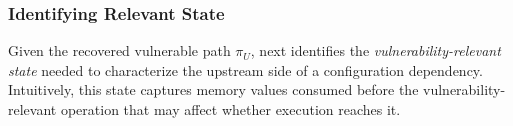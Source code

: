 




\subsubsection{Identifying Relevant State}\label{subsubsec:state}
Given the recovered vulnerable path $\pi_U$, \sys next identifies the \textit{vulnerability-relevant state} needed to characterize the upstream side of a configuration dependency. Intuitively, this state captures memory values consumed before the vulnerability-relevant operation that may affect whether execution reaches it.



